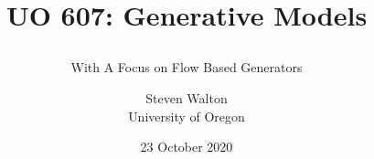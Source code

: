 \documentclass[pdf,11pt]{beamer}
\title{UO 607: Generative Models \subtitle{With A Focus on Flow Based
    Generators}
}
\author{Steven Walton\\ \small University of Oregon}
\date{23 October 2020}
\begin{document}
\frame{\titlepage}


\end{document}
